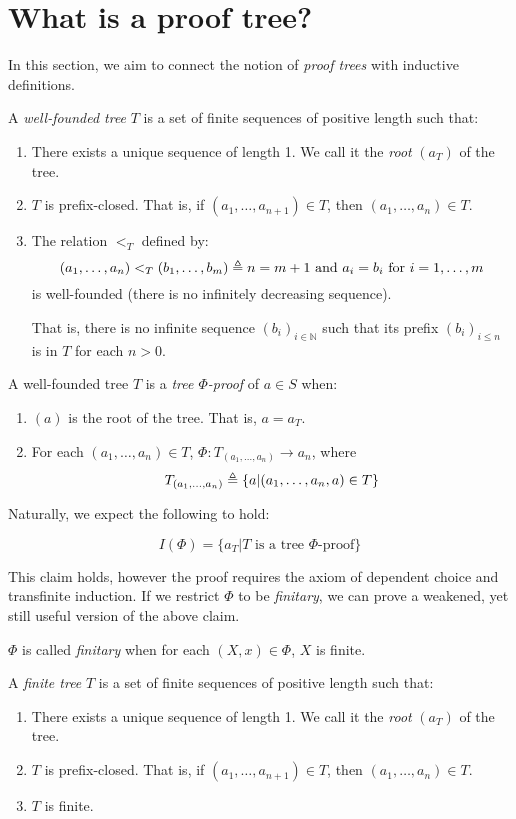 \documentclass[12pt]{article}
\begin{document}
\section{What is a proof tree?}
In this section, we aim to connect the notion of \emph{proof trees} with inductive definitions.
\begin{definition}
	A \emph{well-founded tree} $T$ is a set of finite sequences of positive length such that:
	\begin{enumerate}
		\item There exists a unique sequence of length 1. We call it the \emph{root} $(a_T)$ of the tree.
		\item $T$ is prefix-closed. That is, if $(a_1,\dots,a_{n+1})\in T$, then $(a_1,\dots,a_n)\in T$.
		\item The relation $<_T$ defined by:
		      \[(a_1,\dots,a_n)<_T(b_1,\dots,b_m)\triangleq n=m+1\text{ and }a_i=b_i\text{ for }i=1,\dots,m\]
		      is well-founded (there is no infinitely decreasing sequence).

		      That is, there is no infinite sequence $(b_i)_{i\in\mathbb{N}}$ such that its prefix $(b_i)_{i\le n}$ is in $T$ for each $n>0$.
	\end{enumerate}
\end{definition}
\begin{definition}
	A well-founded tree $T$ is a \emph{tree $\Phi$-proof} of $a\in S$ when:
	\begin{enumerate}
		\item $(a)$ is the root of the tree. That is, $a=a_T$.
		\item For each $(a_1,\dots,a_n)\in T$, $\Phi:T_{(a_1,\dots,a_n)}\rightarrow a_n$, where
		      \[T_{(a_1,\dots,a_n)}\triangleq\{a|(a_1,\dots,a_n,a)\in T\}\]
	\end{enumerate}
\end{definition}
Naturally, we expect the following to hold:
\begin{claim}
	\[I(\Phi)=\{a_T|T\text{ is a tree }\Phi\text{-proof}\}\]
\end{claim}
This claim holds, however the proof requires the axiom of dependent choice and transfinite induction.
If we restrict $\Phi$ to be \emph{finitary}, we can prove a weakened, yet still useful version of the above claim.
\begin{definition}
	$\Phi$ is called \emph{finitary} when for each $(X,x)\in\Phi$, $X$ is finite.
\end{definition}
\begin{definition}
	A \emph{finite tree} $T$ is a set of finite sequences of positive length such that:
	\begin{enumerate}
		\item There exists a unique sequence of length 1. We call it the \emph{root} $(a_T)$ of the tree.
		\item $T$ is prefix-closed. That is, if $(a_1,\dots,a_{n+1})\in T$, then $(a_1,\dots,a_n)\in T$.
		\item $T$ is finite.
	\end{enumerate}
\end{definition}
\end{document}
